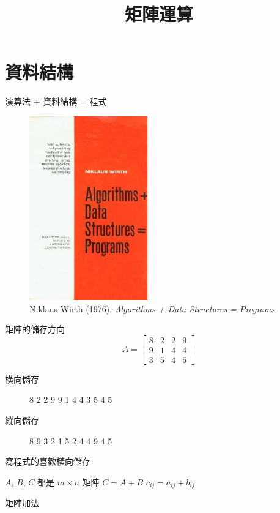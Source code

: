 \documentclass{Amo}
\begin{document}
\title{矩陣運算}
\maketitle

\section{資料結構}
\begin{frame}{演算法 + 資料結構 = 程式}
    \begin{figure}
        \includegraphics[height=0.5\textheight]{MatrixComputations/Algorithms_+_Data_Structures.jpg}
        \caption{Niklaus Wirth (1976).  \textit{Algorithms + Data Structures = Programs}}
    \end{figure}
\end{frame}

\begin{frame}{矩陣的儲存方向}
    \[ A = \begin{bmatrix}
        8 & 2 & 2 & 9 \\
        9 & 1 & 4 & 4 \\
        3 & 5 & 4 & 5
    \end{bmatrix} \]

    \begin{description}
        \item[橫向儲存] 8 2 2 9 9 1 4 4 3 5 4 5
        \item[縱向儲存] 8 9 3 2 1 5 2 4 4 9 4 5 
    \end{description}
\end{frame}

\begin{frame}{寫程式的喜歡橫向儲存}
    \begin{algorithm}[H]
        \begin{algorithmic}
            \REQUIRE $A$, $B$, $C$ 都是 $m \times n$ 矩陣
            \ENSURE  $C = A + B$
                    \STATE $c_{ij} = a_{ij} + b_{ij}$
                \ENDFOR
            \ENDFOR
        \end{algorithmic}
        \caption{矩陣加法}
    \end{algorithm}
\end{frame}
\end{document}
